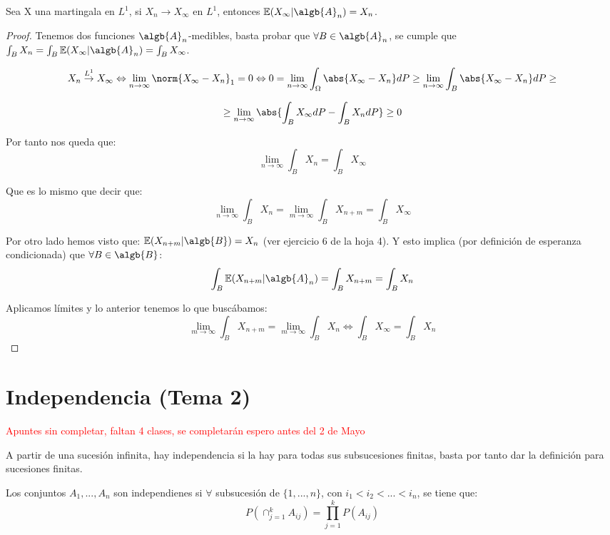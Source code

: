\documentclass{apuntes}
\begin{document}
\begin{theorem}
Sea X una martingala en $L^1$, si $X_n \rightarrow X_{\infty}$ en $L^1$, entonces $\mathbb{E}(X_{\infty}|\algb{A}_n)=X_n$.
\end{theorem}
\begin{proof}
Tenemos dos funciones $\algb{A}_n$-medibles, basta probar que $\forall B \in \algb{A}_n$, se cumple que $\int_B X_n = \int_B \mathbb{E}(X_{\infty}|\algb{A}_n) = \int_B X_{\infty}$.

\[
X_n \stackrel{L^1}{\rightarrow} X_{\infty} \Leftrightarrow \lim_{n \rightarrow \infty} \norm{X_{\infty}-X_n}_1=0 \Leftrightarrow 0= \lim_{n \rightarrow \infty} \int_{\Omega}\abs{X_{\infty}-X_n}dP \geq \lim_{n \rightarrow \infty} \int_B \abs{X_{\infty}-X_n}dP\geq
\]

\[
\geq \lim_{n \rightarrow \infty} \abs{\int_B X_{\infty}dP- \int_B X_n dP} \geq 0
\]


Por tanto nos queda que:
\[
\lim_{n \rightarrow \infty} \int_B X_n = \int_B X_{\infty}
\]

Que es lo mismo que decir que:
\[
\lim_{n \rightarrow \infty} \int_B X_n = \lim_{m \rightarrow \infty} \int_B X_{n+m} = \int_B X_{\infty}
\]

Por otro lado hemos visto que: $\mathbb{E}(X_{n+m}|\algb{B}) = X_n$ (ver ejercicio 6 de la hoja 4). Y esto implica (por definición de esperanza condicionada) que $\forall B \in \algb{B}$:
\[
\int_B \mathbb{E}(X_{n+m}|\algb{A}_n)=\int_B X_{n+m} = \int_B X_n
\]

Aplicamos límites y  lo anterior tenemos lo que buscábamos:
\[
\lim_{m \rightarrow \infty}\int_B X_{n+m} = \lim_{m \rightarrow \infty}\int_B X_{n} \Leftrightarrow \int_B X_{\infty} = \int_B X_n
\]

\end{proof}

\chapter{Independencia (Tema 2)}

\textcolor{red}{Apuntes sin completar, faltan 4 clases, se completarán espero antes del 2 de Mayo}

A partir de una sucesión infinita, hay independencia si la hay para todas sus subsucesiones finitas, basta por tanto dar la definición para sucesiones finitas.

\begin{defn}
Los conjuntos $A_1,...,A_n$ son independienes si $\forall$ subsucesión de $\{1,...,n\}$, con $i_1 < i_2 < ... < i_n$, se tiene que:
\[
P(\cap_{j=1}^k A_{ij}) = \prod_{j=1}^{k}P(A_{ij})
\]
\end{defn}
\end{document}
